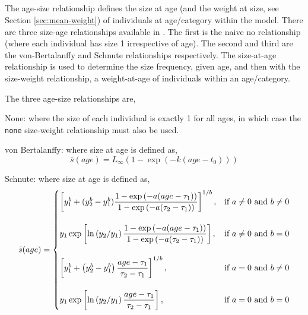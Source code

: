 \subsection{\label{sec:size-at-age}}

The age-size relationship defines the size at age (and the weight at size, see Section \ref{sec:mean-weight}) of individuals at age/category within the model. There are three size-age relationships available in \SPM. The first is the naive no relationship (where each individual has size 1 irrespective of age). The second  and third are the von-Bertalanffy and Schnute relationships respectively. The size-at-age relationship is used to determine the size frequency, given age, and then with the size-weight relationship, a weight-at-age of individuals within an age/category. 

The three age-size relationships are,

\begin{description}
\item {None:} where the size of each individual is exactly 1 for all ages, in which case the \texttt{none} size-weight relationship must also be used.
\item{von Bertalanffy:} where size at age is defined as,
\begin{equation} 
\bar{s}(age)= L_\infty \left( 1 - \exp \left( -k \left(age-t_0 \right) \right) \right)
\end{equation}

\item{Schnute:} where size at age is defined as,
\begin{equation}
\bar{s}(age)=\displaystyle\begin{cases}
  \left[ y_1^b + (y_2^b - y_1^b) \dfrac{1-\exp \left(-a(age - \tau_1) \right)}{1-\exp \left(-a(\tau_2 - \tau_1) \right)} \right]^{1/b}, & \text{if $a\ne0$ and $b\ne0$} \\
  \AddVspace
  y_1 \exp \left[ \ln \left( y_2 / y_1 \right) \dfrac{1-\exp \left(-a(age - \tau_1) \right)}{1-\exp \left(-a(\tau_2 - \tau_1) \right)} \right], & \text{if $a\ne0$ and $b=0$} \\
  \AddVspace
  \left[ y_1^b + \left( y_2^b - y_1^b \right) \dfrac{age-\tau_1}{\tau_2 - \tau_1} \right]^{1/b}, & \text{if $a=0$ and $b\ne0$} \\
  \AddVspace
  y_1 \exp \left[ \ln \left( y_2/y_1 \right) \dfrac{age-\tau_1}{\tau_2 - \tau_1} \right] , & \text{if $a=0$ and $b=0$} \\
  \end{cases}
\end{equation}
\end{description}

